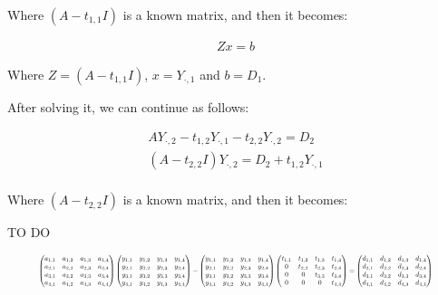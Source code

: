 \documentclass[]{article}
\begin{document}
Where $(A-t_{1,1}I)$ is a known matrix, and then it becomes:

\begin{gather}
Zx = b
\end{gather}

Where $Z = (A-t_{1,1}I)$, $x = Y_{\cdot,1}$ and $b=D_1$.

After solving it, we can continue as follows:

\begin{gather}
AY_{\cdot,2}-t_{1,2}Y_{\cdot,1} - t_{2,2}Y_{\cdot,2} = D_2\\
(A-t_{2,2}I)Y_{\cdot,2}  = D_2 +  t_{1,2}Y_{\cdot,1}\\
\end{gather}

Where $(A-t_{2,2}I)$ is a known matrix, and then it becomes:

TO DO
\newpage

\begin{equation}
\resizebox{.9\hsize}{!}{$
\begin{pmatrix}
	a_{1,1} & a_{1,2} & a_{1,3}  & a_{1,4} \\
	a_{2,1} & a_{2,2} & a_{2,3}  & a_{2,4} \\
	a_{3,1} & a_{3,2} & a_{3,3}  & a_{3,4} \\
	a_{4,1} & a_{4,2} & a_{4,3}  & a_{4,4} \\
\end{pmatrix}
\begin{pmatrix}
y_{1,1} & y_{1,2} & y_{1,3}  & y_{1,4} \\
y_{2,1} & y_{2,2} & y_{2,3}  & y_{2,4} \\
y_{3,1} & y_{3,2} & y_{3,3}  & y_{3,4} \\
y_{4,1} & y_{4,2} & y_{4,3}  & y_{4,4} \\
\end{pmatrix}
-
\begin{pmatrix}
y_{1,1} & y_{1,2} & y_{1,3}  & y_{1,4} \\
y_{2,1} & y_{2,2} & y_{2,3}  & y_{2,4} \\
y_{3,1} & y_{3,2} & y_{3,3}  & y_{3,4} \\
y_{4,1} & y_{4,2} & y_{4,3}  & y_{4,4} \\
\end{pmatrix}
\begin{pmatrix}
t_{1,1} & t_{1,2} & t_{1,3}  & t_{1,4} \\
0 & t_{2,2} & t_{2,3}  & t_{2,4} \\
0 & 0 & t_{3,3}  & t_{3,4} \\
0 & 0 & 0  & t_{4,4} \\
\end{pmatrix}
=
\begin{pmatrix}
d_{1,1} & d_{1,2} & d_{1,3}  & d_{1,4} \\
d_{2,1} & d_{2,2} & d_{2,3}  & d_{2,4} \\
d_{3,1} & d_{3,2} & d_{3,3}  & d_{3,4} \\
d_{4,1} & d_{4,2} & d_{4,3}  & d_{4,4} \\
\end{pmatrix}
$}
\end{equation}
\end{document}
